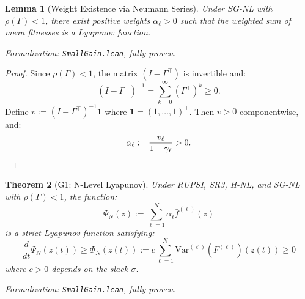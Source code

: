 \documentclass[12pt]{article}
\newtheorem{theorem}{Theorem}[section]
\newtheorem{lemma}[theorem]{Lemma}
\newcommand{\Var}{\mathrm{Var}}
\begin{document}
\begin{lemma}[Weight Existence via Neumann Series]
\label{lem:weight-existence}
Under SG-NL with $\rho(\Gamma) < 1$, there exist positive weights $\alpha_\ell > 0$ such that the weighted sum of mean fitnesses is a Lyapunov function.
\end{lemma}
\noindent\textit{Formalization: \texttt{SmallGain.lean}, fully proven.}

\begin{proof}
Since $\rho(\Gamma) < 1$, the matrix $(I - \Gamma^\top)$ is invertible and:
\[
(I - \Gamma^\top)^{-1} = \sum_{k=0}^\infty (\Gamma^\top)^k \geq 0.
\]
Define $v := (I - \Gamma^\top)^{-1} \mathbf{1}$ where $\mathbf{1} = (1, \ldots, 1)^\top$. Then $v > 0$ componentwise, and:
\[
\alpha_\ell := \frac{v_\ell}{1 - \gamma_\ell} > 0. \qedhere
\]
\end{proof}

\begin{theorem}[G1: N-Level Lyapunov]
\label{thm:g1}
Under RUPSI, SR3, H-NL, and SG-NL with $\rho(\Gamma) < 1$, the function:
\[
\Psi_N(z) := \sum_{\ell=1}^N \alpha_\ell \bar{f}^{(\ell)}(z)
\]
is a strict Lyapunov function satisfying:
\[
\frac{d}{dt} \Psi_N(z(t)) \geq \Phi_N(z(t)) := c \sum_{\ell=1}^N \Var^{(\ell)}(F^{(\ell)})(z(t)) \geq 0
\]
where $c > 0$ depends on the slack $\sigma$.
\end{theorem}
\noindent\textit{Formalization: \texttt{SmallGain.lean}, fully proven.}
\end{document}
